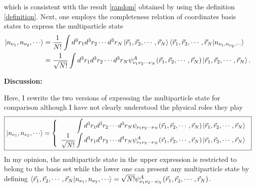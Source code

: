 \documentclass[a4paper,12pts]{article}
\numberwithin{equation}{section}
\begin{document}
	which is consistent with the result \ref{random} obtained by using the definition \ref{definition}. Next, one employs the completeness relation of coordinates basis states to express the multiparticle state
	\begin{align}
	\ket{n_{\nu_1},n_{\nu_2},\cdots} &= \frac{1}{N!}\int d^3r_1d^3r_2\cdots d^3r_N \ket{\vec{r}_1,\vec{r}_2,\cdots,\vec{r}_N}\braket{\vec{r}_1,\vec{r}_2,\cdots,\vec{r}_N|n_{\nu_1,n_{\nu_2},\cdots}}\\
	&= \frac{1}{\sqrt{N!}}\int d^3r_1d^3r_2\cdots d^3r_N\psi^A_{\nu_1\nu_2\cdots\nu_N}(\vec{r}_1,\vec{r}_2,\cdots,\vec{r}_N)\ket{\vec{r}_1,\vec{r}_2,\cdots,\vec{r}_N}.
	\end{align}
	\begin{mdframed}[backgroundcolor=gray!16]
		\textbf{Discussion:}\begin{center}
			\begin{minipage}{42em}
				Here, I rewrite the two versions of expressing the multiparticle state for comparison although I have not clearly understood the physical roles they play
				\begin{equation}
				\boxed{\ket{n_{\nu_1},n_{\nu_2},\cdots} = \left\lbrace\begin{array}{rcl}
					\displaystyle\int d^3r_1d^3r_2\cdots d^3r_N\psi_{\nu_1\nu_2\cdots\nu_N}(\vec{r}_1,\vec{r}_2,\cdots,\vec{r}_N)\ket{\vec{r}_1,\vec{r}_2,\cdots,\vec{r}_N}\\
					\dfrac{1}{\sqrt{N!}}\displaystyle\int d^3r_1d^3r_2\cdots d^3r_N\psi^A_{\nu_1\nu_2\cdots\nu_N}(\vec{r}_1,\vec{r}_2,\cdots,\vec{r}_N)\ket{\vec{r}_1,\vec{r}_2,\cdots,\vec{r}_N}
					\end{array}\right.}
				\end{equation}
				In my opinion, the multiparticle state in the upper expression is restricted to belong to the basis set while the lower one can present any multiparticle state by defining $\braket{\vec{r}_1,\vec{r}_2,\cdots,\vec{r}_N|n_{\nu_1},n_{\nu_2},\cdots} = \sqrt{N!}\psi^A_{\nu_1\nu_2\cdots\nu_N}(\vec{r}_1,\vec{r}_2,\cdots,\vec{r}_N)$. 
			\end{minipage}
		\end{center}
	\end{mdframed}
\end{document}

